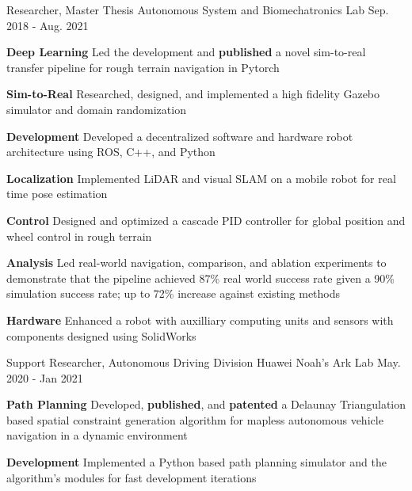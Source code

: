 \begin{cventries}
	\cventry
	{Researcher, Master Thesis}
	{Autonomous System and Biomechatronics Lab}
	{Sep. 2018 - Aug. 2021}
	{}
	{
		\begin{cvitems}
			\item {
				\textbf{Deep Learning} Led the development and \textbf{published} a novel sim-to-real transfer pipeline for rough terrain navigation in Pytorch
			}
			\item {
				\textbf{Sim-to-Real} Researched, designed, and implemented a high fidelity Gazebo simulator and domain randomization
			}
			\item {
				\textbf{Development} Developed a decentralized software and hardware robot architecture using ROS, C++, and Python
			}
			\item {
				\textbf{Localization} Implemented LiDAR and visual SLAM on a mobile robot for real time pose estimation
			}
			\item {
				\textbf{Control} Designed and optimized a cascade PID controller for global position and wheel control in rough terrain
			}
			\item {
				\textbf{Analysis} Led real-world navigation, comparison, and ablation experiments to demonstrate that the pipeline achieved 87\% real world success rate given a 90\% simulation success rate; up to 72\% increase against existing methods
			}
			\item {
				\textbf{Hardware} Enhanced a robot with auxilliary computing units and sensors with components designed using SolidWorks
			}
		\end{cvitems}
	}
	\cventry
	{Support Researcher, Autonomous Driving Division}
	{Huawei Noah’s Ark Lab}
	{May. 2020 - Jan 2021}
	{}
	{
		\begin{cvitems}
			\item {
				\textbf{Path Planning} Developed, \textbf{published}, and \textbf{patented} a Delaunay Triangulation based spatial constraint generation algorithm for mapless autonomous vehicle navigation in a dynamic environment
			}
			\item {
				\textbf{Development} Implemented a Python based path planning simulator and the algorithm's modules for fast development iterations
			}
			\item {
}
\end{cvitems}}
\end{cventries}

